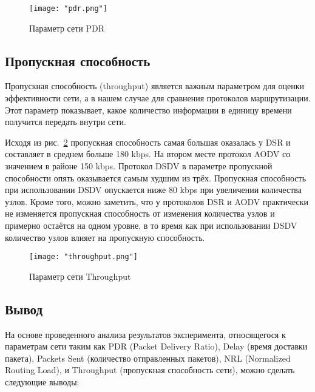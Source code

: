 \begin{figure}[!h]
    \centering
    \texttt{[image: "pdr.png"]}
    \caption{Параметр сети PDR}
    \label{fig:pdr_plot}
\end{figure}

\subsection{Пропускная способность}

Пропускная способность (throughput) является важным параметром для оценки эффективности сети, а в нашем случае для сравнения протоколов маршрутизации. Этот параметр показывает, какое количество информации в единицу времени получится передать внутри сети.

Исходя из рис.~\ref{fig:throughput_plot} пропускная способность самая большая оказалась у DSR и составляет в среднем больше 180 kbps. На втором месте протокол AODV со значением в районе 150 kbps. Протокол DSDV в параметре пропускной способности опять оказывается самым худшим из трёх. Пропускная способность при использовании DSDV опускается ниже 80 kbps при увеличении количества узлов. Кроме того, можно заметить, что у протоколов DSR и AODV практически не изменяется пропускная способность от изменения количества узлов и примерно остаётся на одном уровне, в то время как при использовании DSDV количество узлов влияет на пропускную способность. 

\begin{figure}[!h]
    \centering
    \texttt{[image: "throughput.png"]}
    \caption{Параметр сети Throughput}
    \label{fig:throughput_plot}
\end{figure}

\subsection{Вывод}

На основе проведенного анализа результатов эксперимента, относящегося к параметрам сети таким как PDR (Packet Delivery Ratio), Delay (время доставки пакета), Packets Sent (количество отправленных пакетов), NRL (Normalized Routing Load), и Throughput (пропускная способность сети), можно сделать следующие выводы:

